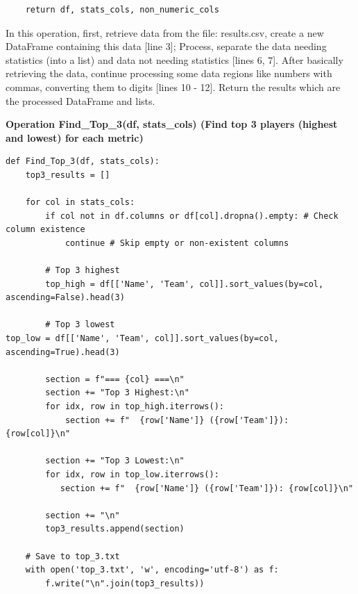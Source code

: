 \documentclass[12pt]{report}
\begin{document}
{{\begin{lstlisting}
    return df, stats_cols, non_numeric_cols
\end{lstlisting}

In this operation, first, retrieve data from the file: results.csv, create a new DataFrame containing this data [line 3]; Process, separate the data needing statistics (into a list) and data not needing statistics [lines 6, 7]. After basically retrieving the data, continue processing some data regions like numbers with commas, converting them to digits [lines 10 - 12]. Return the results which are the processed DataFrame and lists.

\textbf* {Operation Find\_Top\_3(df, stats\_cols) (Find top 3 players (highest and lowest) for each metric)} %
\begin{lstlisting}
def Find_Top_3(df, stats_cols):
    top3_results = []

    for col in stats_cols:
        if col not in df.columns or df[col].dropna().empty: # Check column existence
            continue # Skip empty or non-existent columns

        # Top 3 highest
        top_high = df[['Name', 'Team', col]].sort_values(by=col, ascending=False).head(3)

        # Top 3 lowest
top_low = df[['Name', 'Team', col]].sort_values(by=col, ascending=True).head(3)

        section = f"=== {col} ===\n"
        section += "Top 3 Highest:\n"
        for idx, row in top_high.iterrows():
            section += f"  {row['Name']} ({row['Team']}): {row[col]}\n"

        section += "Top 3 Lowest:\n"
        for idx, row in top_low.iterrows():
           section += f"  {row['Name']} ({row['Team']}): {row[col]}\n"

        section += "\n"
        top3_results.append(section)

    # Save to top_3.txt
    with open('top_3.txt', 'w', encoding='utf-8') as f:
        f.write("\n".join(top3_results))


\end{lstlisting}}}
\end{document}
